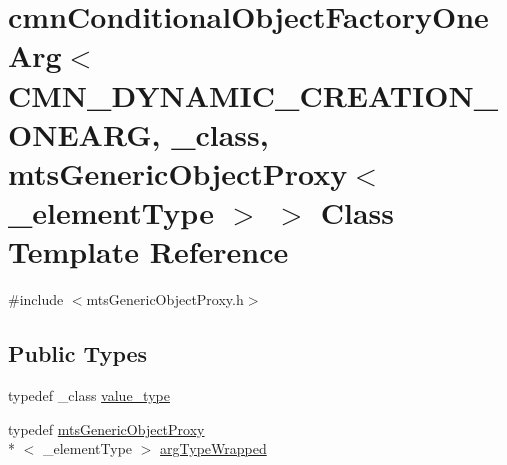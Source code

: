 \hypertarget{classcmn_conditional_object_factory_one_arg_3_01_c_m_n___d_y_n_a_m_i_c___c_r_e_a_t_i_o_n___o_n_e238fc68bde68abb82aef992b13cfbb36}{\section{cmn\-Conditional\-Object\-Factory\-One\-Arg$<$ C\-M\-N\-\_\-\-D\-Y\-N\-A\-M\-I\-C\-\_\-\-C\-R\-E\-A\-T\-I\-O\-N\-\_\-\-O\-N\-E\-A\-R\-G, \-\_\-class, mts\-Generic\-Object\-Proxy$<$ \-\_\-element\-Type $>$ $>$ Class Template Reference}
\label{classcmn_conditional_object_factory_one_arg_3_01_c_m_n___d_y_n_a_m_i_c___c_r_e_a_t_i_o_n___o_n_e238fc68bde68abb82aef992b13cfbb36}
}


{\ttfamily \#include $<$mts\-Generic\-Object\-Proxy.\-h$>$}

\subsection*{Public Types}
\begin{DoxyCompactItemize}
\item 
typedef \-\_\-class \hyperlink{classcmn_conditional_object_factory_one_arg_3_01_c_m_n___d_y_n_a_m_i_c___c_r_e_a_t_i_o_n___o_n_e238fc68bde68abb82aef992b13cfbb36_a698eb0cfa7a5e42a11a97a8f4015c196}{value\-\_\-type}
\item 
typedef \hyperlink{classmts_generic_object_proxy}{mts\-Generic\-Object\-Proxy}\\*
$<$ \-\_\-element\-Type $>$ \hyperlink{classcmn_conditional_object_factory_one_arg_3_01_c_m_n___d_y_n_a_m_i_c___c_r_e_a_t_i_o_n___o_n_e238fc68bde68abb82aef992b13cfbb36_aecff2801fe164f706c71f1f6abe0e2d6}{arg\-Type\-Wrapped}
\end{DoxyCompactItemize}

